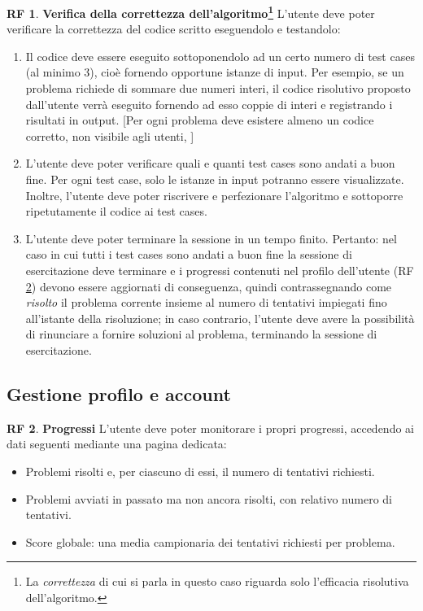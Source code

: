 \documentclass[11pt, a4paper]{article}
\theoremstyle{definition}
\newtheorem{funcreq}{RF} %
\begin{document}
\begin{funcreq}
\label{test}
\textbf{Verifica della correttezza dell'algoritmo\footnote{La \textit{correttezza} di cui si parla in questo caso riguarda solo l'efficacia risolutiva dell'algoritmo.} }
L'utente deve poter verificare la correttezza del codice scritto eseguendolo
e testandolo:
\begin{enumerate}
    \item Il codice deve essere eseguito sottoponendolo ad un certo numero
    di test cases (al minimo 3),
    cioè fornendo opportune istanze di input. Per esempio,
    se un problema richiede di sommare due numeri interi, il codice risolutivo
    proposto dall'utente verrà eseguito fornendo ad esso coppie di interi
    e registrando i risultati in output. [Per ogni problema deve esistere almeno
    un codice corretto, non visibile agli utenti, ]

    \item L'utente deve poter verificare quali e quanti test cases sono andati
    a buon fine. Per ogni test case, solo le istanze in input potranno
    essere visualizzate. Inoltre, l'utente deve poter riscrivere e
    perfezionare l'algoritmo e sottoporre ripetutamente il codice ai
    test cases.

    \item L'utente deve poter terminare la sessione in un tempo finito.
    Pertanto: nel caso in cui tutti i test cases sono andati a buon fine
    la sessione di esercitazione deve terminare e i progressi contenuti
    nel profilo dell'utente (RF \ref{stats}) devono essere aggiornati
    di conseguenza, quindi contrassegnando come
    \textit{risolto} il problema corrente insieme al numero di
    tentativi impiegati fino all'istante della risoluzione; in caso contrario,
    l'utente deve avere la possibilità di rinunciare a fornire soluzioni
    al problema, terminando la sessione di esercitazione.
\end{enumerate}
\end{funcreq}

\subsection{Gestione profilo e account}

\begin{funcreq}
\label{stats}
\textbf{Progressi }
L'utente deve poter monitorare i propri progressi, accedendo ai dati
seguenti mediante una pagina dedicata:
\begin{itemize}
    \item Problemi risolti e, per ciascuno di essi, il numero di tentativi richiesti.
    \item Problemi avviati in passato ma non ancora risolti, con relativo
    numero di tentativi.
    \item Score globale: una media campionaria dei tentativi richiesti
    per problema.
\end{itemize}
\end{funcreq}
\end{document}
